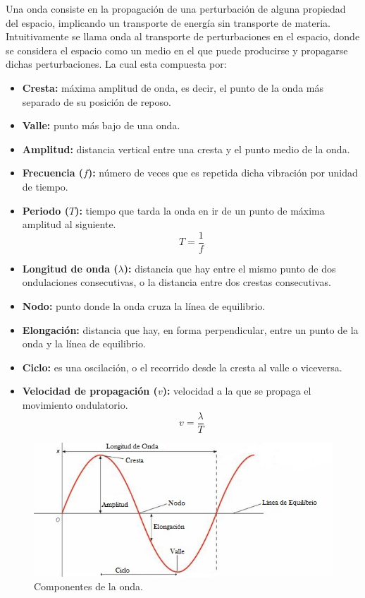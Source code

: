 \documentclass[letterpaper,titlepage,12pt,draft]{report}
\begin{document}
Una onda consiste en la propagaci\'on de una perturbaci\'on de alguna propiedad del espacio, implicando un transporte de energ\'ia sin transporte de materia. Intuitivamente se llama onda al transporte de perturbaciones en el espacio, donde se considera el espacio como un medio en el que puede producirse y propagarse dichas perturbaciones. La cual esta compuesta por:
\begin{itemize}
\item{\bf Cresta:} m\'axima amplitud de onda, es decir, el punto de la onda m\'as separado de su posici\'on de reposo. 
\item{\bf Valle:} punto m\'as bajo de una onda.
\item{\bf Amplitud:} distancia vertical entre una cresta y el punto medio de la onda.
\item{\bf Frecuencia ($f$):} n\'umero de veces que es repetida dicha vibraci\'on por unidad de tiempo.
\item{\bf Periodo ($T$):} tiempo que tarda la onda en ir de un punto de m\'axima amplitud al siguiente. $$T=\frac{1}{f}$$
\item{\bf Longitud de onda ($\lambda$):} distancia que hay entre el mismo punto de dos ondulaciones consecutivas, o la distancia entre dos crestas consecutivas.
\item{\bf Nodo:} punto donde la onda cruza la l\'inea de equilibrio.
\item{\bf Elongaci\'on:} distancia que hay, en forma perpendicular, entre un punto de la onda y la l\'inea de equilibrio.
\item{\bf Ciclo:} es una oscilaci\'on, o el recorrido desde la cresta al valle o viceversa.
\item{\bf Velocidad de propagaci\'on ($v$):} velocidad a la que se propaga el movimiento ondulatorio.$$v=\frac{\lambda}{T}$$
\end{itemize}

\begin{figure}[H]
\begin{center}
\includegraphics[scale=0.5]{onda.jpg}
\caption{Componentes de la onda.}
\label{fig:onda}
\end{center}
\end{figure}
\end{document}
